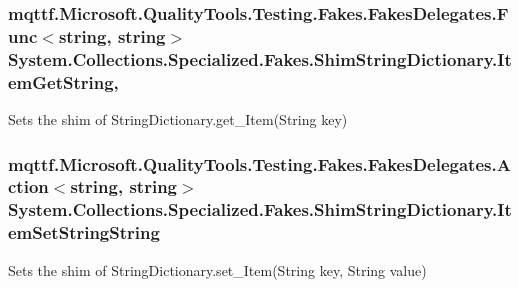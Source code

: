 \hypertarget{class_system_1_1_collections_1_1_specialized_1_1_fakes_1_1_shim_string_dictionary_a583209531ea2a940a7038be1bfed4b5c}{
\subsubsection[{Item\-Get\-String}]{\setlength{\rightskip}{0pt plus 5cm}mqttf.\-Microsoft.\-Quality\-Tools.\-Testing.\-Fakes.\-Fakes\-Delegates.\-Func$<$string, string$>$ System.\-Collections.\-Specialized.\-Fakes.\-Shim\-String\-Dictionary.\-Item\-Get\-String\hspace{0.3cm}{\ttfamily [get]}, {\ttfamily [set]}}}\label{class_system_1_1_collections_1_1_specialized_1_1_fakes_1_1_shim_string_dictionary_a583209531ea2a940a7038be1bfed4b5c}


Sets the shim of String\-Dictionary.\-get\-\_\-\-Item(\-String key)

\hypertarget{class_system_1_1_collections_1_1_specialized_1_1_fakes_1_1_shim_string_dictionary_a390a06ae13137a26a0e4d0d554062c8e}{
\subsubsection[{Item\-Set\-String\-String}]{\setlength{\rightskip}{0pt plus 5cm}mqttf.\-Microsoft.\-Quality\-Tools.\-Testing.\-Fakes.\-Fakes\-Delegates.\-Action$<$string, string$>$ System.\-Collections.\-Specialized.\-Fakes.\-Shim\-String\-Dictionary.\-Item\-Set\-String\-String\hspace{0.3cm}{\ttfamily [set]}}}\label{class_system_1_1_collections_1_1_specialized_1_1_fakes_1_1_shim_string_dictionary_a390a06ae13137a26a0e4d0d554062c8e}


Sets the shim of String\-Dictionary.\-set\-\_\-\-Item(\-String key, String value)


